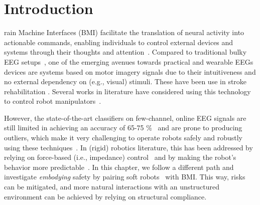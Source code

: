 \section{Introduction}
rain Machine Interfaces (BMI) \citep{liu2024cognitive} facilitate the translation of neural activity into actionable commands, enabling individuals to control external devices and systems through their thoughts and attention~\citep{coyle2007brain,lee2017brain}. Compared to traditional bulky EEG setups~\citep{van2012brain}, one of the emerging avenues towards practical and wearable \glspl{EEG} devices are systems based on motor imagery signals due to their intuitiveness and no external dependency on (e.g., visual) stimuli. These have been use in stroke rehabilitation \citep{khan2020review}. Several works in literature have considered using this technology to control robot manipulators~\citep{schiatti2017soft,aldini2019effect,lee2024noir}. %

However, the state-of-the-art classifiers on few-channel, online \gls{EEG} signals are still limited in achieving an accuracy of 65-75 \si{\percent}~\citep{arpaia2022non, lee2024noir} and are prone to producing outliers, which make it very challenging to operate robots safely and robustly using these techniques~\citep{liu2024cognitive}. In (rigid) robotics literature, this has been addressed by relying on force-based (i.e., impedance) control~\citep{schiatti2017soft} and by making the robot's behavior more predictable~\citep{aldini2019effect}.
%
%
In this chapter, we follow a different path and investigate \textit{embodying} safety by pairing soft robots~\citep{rus2015design, della2020softencyclopedia} 
with \gls{BMI}. This way, risks can be mitigated, and more natural interactions with an unstructured environment can be achieved by relying on structural compliance.

